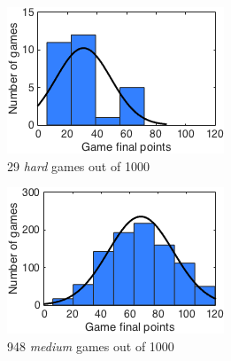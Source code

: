\begin{figure}[h]
        \centering
        \begin{subfigure}[h]{0.32\textwidth}
                \includegraphics[width=\textwidth]{./img/appendix/histChard}
                \caption{29 \emph{hard} games out of 1000}
                \label{app:histChard}
        \end{subfigure}
        \begin{subfigure}[h]{0.32\textwidth}
                \includegraphics[width=\textwidth]{./img/appendix/histCmedium}
                \caption{948 \emph{medium} games out of 1000}
                \label{app:histCmedium}
        \end{subfigure}
        \begin{subfigure}[h]{0.32\textwidth}

\end{subfigure}
\end{figure}
